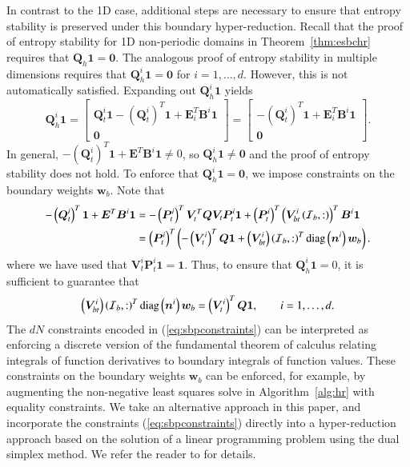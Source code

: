 \documentclass[preprint,10pt]{elsarticle}
\theoremstyle{definition}
\theoremstyle{lemma}
\theoremstyle{theorem}
\theoremstyle{assumption}
\newcommand{\LRp}[1]{\left( #1 \right)}
\newcommand{\note}[1]{{\color{blue}{#1}}}
\begin{document}
In contrast to the 1D case, additional steps are necessary to ensure that entropy stability is preserved under this boundary hyper-reduction.  Recall that the proof of entropy stability for 1D non-periodic domains in Theorem~\ref{thm:esbchr} requires that $\bm{Q}_h\bm{1} = \bm{0}$.  The analogous proof of entropy stability in multiple dimensions requires that $\bm{Q}^i_h\bm{1} = \bm{0}$ for $i = 1,\ldots, d$.  However, this is not automatically satisfied.  Expanding out $\bm{Q}^i_h\bm{1}$ yields
\[
\bm{Q}^i_h\bm{1} = \begin{bmatrix}
\bm{Q}^i_t\bm{1} - \LRp{\bm{Q}^i_t}^T\bm{1} + \bm{E}_i^T\bm{B}^i \bm{1}\\
\bm{0}
\end{bmatrix}= \begin{bmatrix}
-\LRp{\bm{Q}^i_t}^T\bm{1} + \bm{E}_i^T\bm{B}^i \bm{1}\\
\bm{0}
\end{bmatrix}.
\]
In general, $-\LRp{\bm{Q}^i_t}^T\bm{1} + \bm{E}^T\bm{B}^i \bm{1}\neq 0$, so $\bm{Q}^i_h\bm{1} \neq \bm{0}$ and the proof of entropy stability does not hold.  To enforce that $\bm{Q}^i_h\bm{1} = \bm{0}$, we impose constraints on the boundary weights $\bm{w}_b$.  Note that 
\begin{align*}
-\LRp{\bm{Q}^i_t}^T\bm{1} + \bm{E}^T\bm{B}^i \bm{1} &= -\LRp{\bm{P}^i_t}^T\bm{V}_t^T\bm{Q}\bm{V}_t\bm{P}^i_t\bm{1} + \LRp{\bm{P}^i_t}^T\LRp{\bm{V}^i_{bt}\LRp{\mathcal{I}_b,:}}^T\bm{B}^i\bm{1}\\
&= \LRp{\bm{P}^i_t}^T\LRp{-\LRp{\bm{V}^i_t}^T\bm{Q}\bm{1} + \LRp{\bm{V}^i_{bt}}\LRp{\mathcal{I}_b,:}^T{\rm diag}\LRp{\bm{n}^i}\bm{w}_b}.
\end{align*}
where we have used that $\bm{V}^i_t\bm{P}^i_t\bm{1} = \bm{1}$.  Thus, to ensure that $\bm{Q}^i_h\bm{1} = 0$, it is sufficient to guarantee that
\begin{equation}
\LRp{\bm{V}^i_{bt}}\LRp{\mathcal{I}_b,:}^T{\rm diag}\LRp{\bm{n}^i}\bm{w}_b = \LRp{\bm{V}^i_t}^T\bm{Q}\bm{1}, \qquad i = 1,\ldots, d.
\label{eq:sbpconstraints}
\end{equation}
The $dN$ constraints encoded in (\ref{eq:sbpconstraints}) can be interpreted as enforcing a discrete version of the fundamental theorem of calculus relating integrals of function derivatives to boundary integrals of function values.  These constraints on the boundary weights $\bm{w}_b$ can be enforced, for example, by augmenting the non-negative least squares solve in Algorithm~\ref{alg:hr} with equality constraints.  We take an alternative approach in this paper, and incorporate the constraints (\ref{eq:sbpconstraints}) directly into a hyper-reduction approach based on the solution of a linear programming problem using the dual simplex method.  We refer the reader to \cite{yano2019lp} for details.  %
\end{document}
